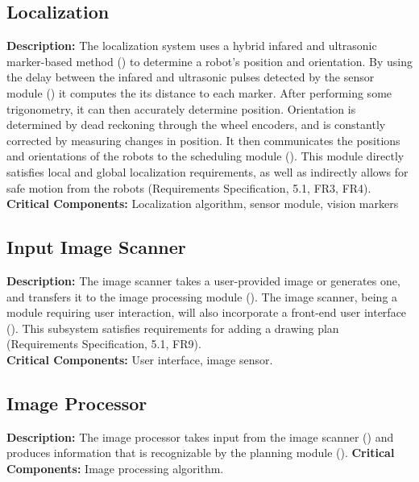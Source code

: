 \subsection{Localization}
\label{sec:subsystem_localization}
\textbf{Description:} The localization system uses a hybrid infared and ultrasonic marker-based method () to determine a robot's position and orientation. By using the delay between the infared and ultrasonic pulses detected by the sensor module () it computes the its distance to each marker. After performing some trigonometry, it can then accurately determine position. Orientation is determined by dead reckoning through the wheel encoders, and is constantly corrected by measuring changes in position. It then communicates the positions and orientations of the robots to the scheduling module (). This module directly satisfies local and global localization requirements, as well as indirectly allows for safe motion from the robots (Requirements Specification, 5.1, FR3, FR4).
\textbf{Critical Components:} Localization algorithm, sensor module, vision markers

\subsection{Input Image Scanner}
\label{sec:subsystem_input_scanner}
\textbf{Description:} The image scanner takes a user-provided image or generates one, and transfers it to the image processing module (). The image scanner, being a module requiring user interaction, will also incorporate a front-end user interface (). This subsystem satisfies requirements for adding a drawing plan (Requirements Specification, 5.1, FR9).\\
\textbf{Critical Components:} User interface, image sensor.\\

\subsection{Image Processor}
\label{sec:subsystem_image_processor}
\textbf{Description:} The image processor takes input from the image scanner () and produces information that is recognizable by the planning module ().
\textbf{Critical Components:} Image processing algorithm.

